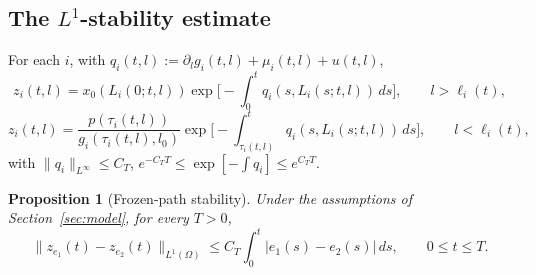 \documentclass[a4paper,fleqn,longmktitle]{cas-sc}
\theoremstyle{plain}
\newtheorem{proposition}[theorem]{Proposition}
\theoremstyle{definition}
\theoremstyle{remark}
\numberwithin{equation}{section}
\begin{document}
\subsection{The \(L^1\)-stability estimate}
For each \(i\), with \(q_i(t,l):=\partial_lg_i(t,l)+\mu_i(t,l)+u(t,l)\),
\begin{equation}
    \label{eq:app_initial_branch}
    z_i(t,l)
    =
    x_0(L_i(0;t,l))
    \exp\!\Big[-\!\int_0^t q_i(s,L_i(s;t,l))\,ds\Big],
    \qquad l>\ell_i(t),
\end{equation}
\begin{equation}
    \label{eq:app_boundary_branch}
    z_i(t,l)
    =
    \frac{p(\tau_i(t,l))}{g_i(\tau_i(t,l),l_0)}
    \exp\!\Big[-\!\int_{\tau_i(t,l)}^t q_i(s,L_i(s;t,l))\,ds\Big],
    \qquad l<\ell_i(t),
\end{equation}
with \(\|q_i\|_{L^\infty}\le C_T\), \(e^{-C_TT}\le\exp[-\int q_i]\le e^{C_TT}\).
\begin{proposition}[Frozen-path stability]
\label{prop:app_frozen_path_stability}
Under the assumptions of Section~\ref{sec:model}, for every \(T>0\),
\begin{equation}
    \label{eq:app_frozen_path_stability}
    \|z_{e_1}(t)-z_{e_2}(t)\|_{L^1(\Omega)}
    \le
    C_T\int_0^t|e_1(s)-e_2(s)|\,ds,
    \qquad
    0\le t\le T.
\end{equation}
\end{proposition}
\end{document}
